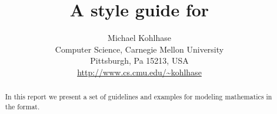 \documentclass[11pt,twoside,titlepage]{report}
\title{A style guide for {\omdoc}}
\author{Michael Kohlhase\\
  Computer Science, Carnegie Mellon University\\
  Pittsburgh, Pa 15213, USA\\
  {\url{http://www.cs.cmu.edu/~kohlhase}}}
\begin{document}
\maketitle
\setcounter{page}{0}
\begin{abstract}
  In this report we present a set of guidelines and examples for modeling
  mathematics in the {\omdoc} format. 
\end{abstract}
\newpage
\setcounter{tocdepth}{2}\tableofcontents
\newpage{}



\newpage 
 
 
\newpage
{\small}
%
\end{document}
